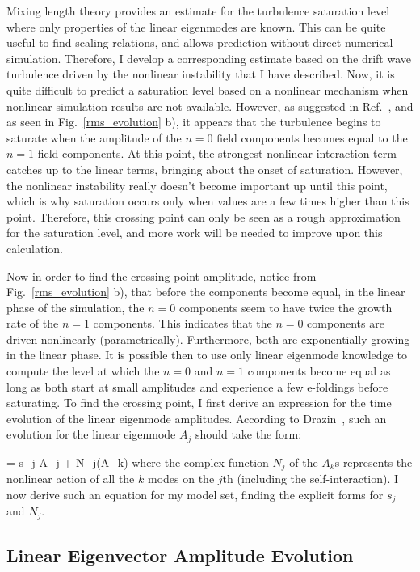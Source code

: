 Mixing length theory provides an estimate for the turbulence saturation level where only properties of the linear eigenmodes are known. This can be quite useful to find scaling relations, and allows
prediction without direct numerical simulation. Therefore, I develop a corresponding estimate based on the drift wave turbulence driven by the nonlinear instability that I have described.
Now, it is quite difficult to predict a saturation level based on a nonlinear mechanism when nonlinear simulation results are not available. However, as suggested in Ref.~\cite{cheng1979},
and as seen in Fig.~\ref{rms_evolution} b), it appears that the turbulence begins to saturate when the amplitude of the $n=0$ field components becomes equal to the $n=1$ field components.
At this point, the strongest nonlinear interaction term catches up to the linear terms, bringing about the onset of saturation. However, the nonlinear instability really doesn't become important
up until this point, which is why saturation occurs only when values are a few times higher than this point. Therefore, this crossing point can only be seen as a rough approximation for the
saturation level, and more work will be needed to improve upon this calculation.

Now in order to find the crossing point amplitude, notice from Fig.~\ref{rms_evolution} b), that before the components become equal, in the linear phase of the simulation,
the $n=0$ components seem to have twice the growth rate of the $n=1$ components. This indicates that the
$n=0$ components are driven nonlinearly (parametrically). Furthermore, both are exponentially growing in the linear phase. It is possible then to use only linear eigenmode knowledge
to compute the level at which the $n=0$ and $n=1$ components become equal as long as both start at small amplitudes and experience a few e-foldings before saturating. To find the crossing
point, I first derive an expression for the time evolution of the linear eigenmode amplitudes. According to Drazin~\cite{drazin1981}, such an evolution for the linear eigenmode $A_j$
should take the form:

\beq
\label{drazin_form}
 =  s_j A_j + N_j(A_k)
\eeq
where the complex function $N_j$ of the $A_k$s represents the nonlinear action of all the $k$ modes on the $j$th (including the self-interaction). I now derive such an equation for my model
set, finding the explicit forms for $s_j$ and $N_j$.

\subsection{Linear Eigenvector Amplitude Evolution}
\label{ss_eigenmode_ev}

